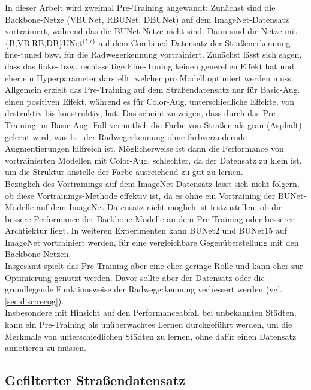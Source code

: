 In dieser Arbeit wird zweimal Pre-Training angewandt: Zunächst sind die Backbone-Netze (VBUNet, RBUNet, DBUNet) 
auf dem ImageNet-Datensatz vortrainiert, während das die BUNet-Netze nicht sind. Dann sind die Netze 
mit \{B,VB,RB,DB\}UNet$^{\{l,r\}}$ auf dem Combined-Datensatz der Straßenerkennung fine-tuned bzw. für die 
Radwegerkennung vortrainiert. Zunächst lässt sich sagen, dass das links- bzw. rechtsseitige Fine-Tuning 
keinen generellen Effekt hat und eher ein Hyperparameter darstellt, welcher pro Modell optimiert werden muss. 
Allgemein erzielt das Pre-Training auf dem Straßendatensatz nur für Basic-Aug. einen positiven Effekt, 
während es für Color-Aug. unterschiedliche Effekte, von destruktiv bis konstruktiv, hat. 
Das scheint zu zeigen, dass durch das Pre-Training im Basic-Aug.-Fall vermutlich die Farbe von Straßen als 
grau (Asphalt) gelernt wird, was bei der Radwegerkennung ohne farbverändernde Augmentierungen hilfreich ist.  
Möglicherweise ist dann die Performance von vortrainierten Modellen mit Color-Aug. schlechter, 
da der Datensatz zu klein ist, um die Struktur anstelle der Farbe ausreichend zu gut zu lernen. \\ 
Bezüglich des Vortrainings auf dem ImageNet-Datensatz lässt sich nicht folgern, 
ob diese Vortrainings-Methode effektiv ist, da es ohne ein Vortraining der BUNet-Modelle auf dem ImageNet-Datensatz 
nicht möglich ist festzustellen, ob die bessere Performance der Backbone-Modelle an dem Pre-Training oder 
besserer Archtiektur liegt. In weiteren Experimenten kann BUNet2 und BUNet15 auf ImageNet vortrainiert werden, 
für eine vergleichbare Gegenüberstellung mit den Backbone-Netzen. \\
Insgesamt spielt das Pre-Training aber eine eher geringe Rolle und kann eher zur Optimierung genutzt werden. 
Davor sollte aber der Datensatz oder die grundlegende Funktionsweise der Radwegerkennung verbessert werden (vgl. \autoref{sec:disc:recog}). \\
Insbesondere mit Hinsicht auf den Performanceabfall bei unbekannten Städten, kann ein Pre-Training 
als unüberwachtes Lernen durchgeführt werden, um die Merkmale von unterschiedlichen Städten zu lernen, 
ohne dafür einen Datensatz annotieren zu müssen. 

\subsection{Gefilterter Straßendatensatz}

\newcommand{\overbar}[1]{\mkern 8mu\overline{\mkern-8mu#1\mkern-8mu}\mkern 8mu}

